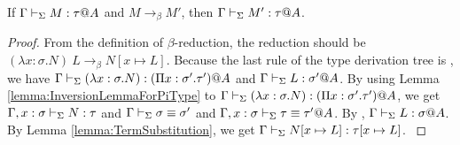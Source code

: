 \begin{lemma}
    \label{lemma:PreservationOnBetaReduction}
    If $\G\V M:\tau@A$ and $M \longrightarrow_{\beta} M'$, then $\G\V M':\tau@A$.
\end{lemma}

\begin{proof}
    {
        \newcommand{\LB}{\longrightarrow_{\beta}}
        From the definition of \( \beta \)-reduction, the reduction should be
        $(\lambda x:\sigma.N)\ L \LB N[x\mapsto L]$.  Because the last rule of
        the type derivation tree is \TApp, we have $\Gamma \vdash_\Sigma (\lambda x:\sigma.N)
        : (\Pi x:\sigma'.\tau')@A$ and $\Gamma \vdash_\Sigma L:\sigma' @A$.  By using Lemma
        \ref{lemma:InversionLemmaForPiType} to $\Gamma \vdash_\Sigma (\lambda x:\sigma.N) :
        (\Pi x:\sigma'.\tau')@A$, we get $\Gamma, x:\sigma \vdash_\Sigma N:\tau$ and $\Gamma \vdash_\Sigma
        \sigma \equiv \sigma'$ and $\Gamma ,x:\sigma \vdash_\Sigma \tau \equiv \tau'@A$.  By \TConv ,
        $\Gamma \vdash_\Sigma L:\sigma @A$.  By Lemma \ref{lemma:TermSubstitution}, we get $\Gamma \vdash_\Sigma
        N[x\mapsto L]:\tau[x\mapsto L]$.
    }

\end{proof}



